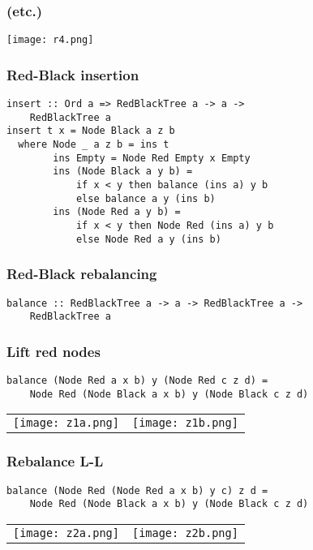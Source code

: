 \documentclass[14pt,t,usepdftitle=false,
xcolornames=x11names,svgnames,dvipsnames]{beamer}
\begin{document}
\begin{frame}
  \frametitle{(etc.)}
  \begin{center}
    \texttt{[image: r4.png]}
  \end{center}
\end{frame}

\begin{frame}
  \frametitle{Red-Black insertion}
\begin{lstlisting}
insert :: Ord a => RedBlackTree a -> a ->
    RedBlackTree a
insert t x = Node Black a z b
  where Node _ a z b = ins t
        ins Empty = Node Red Empty x Empty
        ins (Node Black a y b) =
            if x < y then balance (ins a) y b
            else balance a y (ins b)
        ins (Node Red a y b) =
            if x < y then Node Red (ins a) y b
            else Node Red a y (ins b)
\end{lstlisting}
\end{frame}

\begin{frame}[fragile]
  \frametitle{Red-Black rebalancing}
\begin{lstlisting}
balance :: RedBlackTree a -> a -> RedBlackTree a ->
    RedBlackTree a
\end{lstlisting}
\end{frame}

\begin{frame}[fragile]
  \frametitle{Lift red nodes}
\begin{lstlisting}
balance (Node Red a x b) y (Node Red c z d) =
    Node Red (Node Black a x b) y (Node Black c z d)
\end{lstlisting}
  \begin{tabular}{cc}
  \texttt{[image: z1a.png]}
  &
  \texttt{[image: z1b.png]}
  \end{tabular}
\end{frame}

\begin{frame}[fragile]
  \frametitle{Rebalance L-L}
\begin{lstlisting}
balance (Node Red (Node Red a x b) y c) z d =
    Node Red (Node Black a x b) y (Node Black c z d)
\end{lstlisting}
  \begin{tabular}{cc}
  \texttt{[image: z2a.png]}
  &
  \texttt{[image: z2b.png]}
  \end{tabular}
\end{frame}
\end{document}
